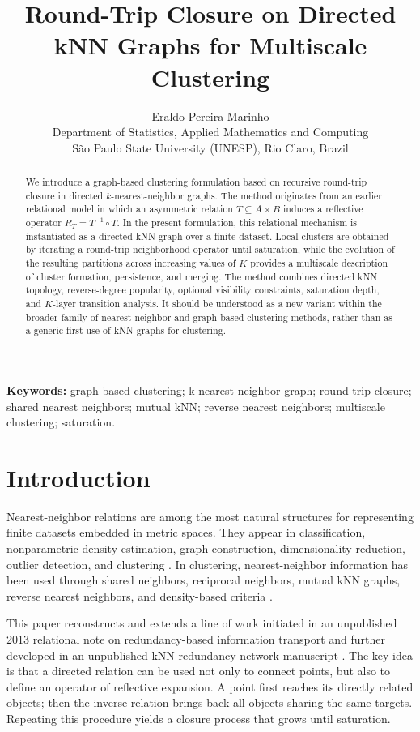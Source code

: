 \documentclass[11pt,a4paper]{article}
\title{Round-Trip Closure on Directed kNN Graphs for Multiscale Clustering}
\author{Eraldo Pereira Marinho\\
\small Department of Statistics, Applied Mathematics and Computing\\
\small S\~ao Paulo State University (UNESP), Rio Claro, Brazil}
\date{}
\begin{document}
\maketitle

\begin{abstract}
We introduce a graph-based clustering formulation based on recursive round-trip closure in directed $k$-nearest-neighbor graphs. The method originates from an earlier relational model in which an asymmetric relation $T\subseteq A\times B$ induces a reflective operator $R_T=T^{-1}\circ T$. In the present formulation, this relational mechanism is instantiated as a directed kNN graph over a finite dataset. Local clusters are obtained by iterating a round-trip neighborhood operator until saturation, while the evolution of the resulting partitions across increasing values of $K$ provides a multiscale description of cluster formation, persistence, and merging. The method combines directed kNN topology, reverse-degree popularity, optional visibility constraints, saturation depth, and $K$-layer transition analysis. It should be understood as a new variant within the broader family of nearest-neighbor and graph-based clustering methods, rather than as a generic first use of kNN graphs for clustering.
\end{abstract}

\noindent\textbf{Keywords:} graph-based clustering; k-nearest-neighbor graph; round-trip closure; shared nearest neighbors; mutual kNN; reverse nearest neighbors; multiscale clustering; saturation.

\section{Introduction}

Nearest-neighbor relations are among the most natural structures for representing finite datasets embedded in metric spaces. They appear in classification, nonparametric density estimation, graph construction, dimensionality reduction, outlier detection, and clustering \citep{CoverHart1967,LoftsgaardenQuesenberry1965,Bentley1975,FriedmanBentleyFinkel1977,VonLuxburg2007}. In clustering, nearest-neighbor information has been used through shared neighbors, reciprocal neighbors, mutual kNN graphs, reverse nearest neighbors, and density-based criteria \citep{JarvisPatrick1973,ErtozSteinbachKumar2003,BritoChavezQuirozYukich1997,GowdaKrishna1978,ChowdhuryAmorim2018,XieLeeWangChenZhou2019}.

This paper reconstructs and extends a line of work initiated in an unpublished 2013 relational note on redundancy-based information transport \citep{Marinho2013RedundanceRevised} and further developed in an unpublished kNN redundancy-network manuscript \citep{Marinho2018KNN}. The key idea is that a directed relation can be used not only to connect points, but also to define an operator of reflective expansion. A point first reaches its directly related objects; then the inverse relation brings back all objects sharing the same targets. Repeating this procedure yields a closure process that grows until saturation.
\end{document}
